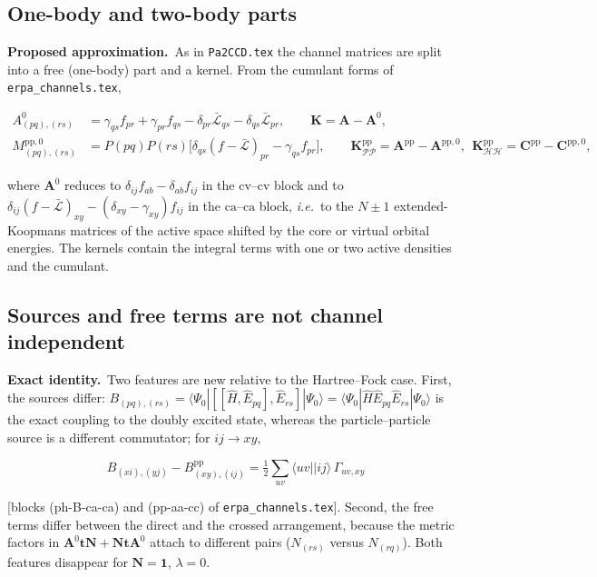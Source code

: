 \documentclass[aip,jcp,reprint,noshowkeys,superscriptaddress]{revtex4-1}
\newcommand{\ie}{\textit{i.e.}}
\newcommand{\bI}{\boldsymbol{1}}
\newcommand{\bA}{\boldsymbol{A}}
\newcommand{\bC}{\boldsymbol{C}}
\newcommand{\bN}{\boldsymbol{N}}
\newcommand{\pp}{\text{pp}}
\newcommand{\sLag}{\bar{\mathcal L}}
\newcommand{\scv}{\text{cv}}
\newcommand{\sca}{\text{ca}}
\newcommand{\Exact}{\textbf{Exact identity.}\ }
\newcommand{\Proposed}{\textbf{Proposed approximation.}\ }
\newcommand{\bt}{\boldsymbol{t}}
\newcommand{\bK}{\boldsymbol{K}}
\begin{document}
\subsection{One-body and two-body parts}

\Proposed As in \texttt{Pa2CCD.tex} the channel matrices are split into a
free (one-body) part and a kernel.  From the cumulant forms of
\texttt{erpa\_channels.tex},
\begin{widetext}
\begin{align}
  A^{0}_{(pq),(rs)}&=\gamma_{qs}f_{pr}+\gamma_{pr}f_{qs}-\delta_{pr}\sLag_{qs}-\delta_{qs}\sLag_{pr},
  \qquad \bK=\bA-\bA^{0},
  \label{eq:A0}\\
  M^{\pp,0}_{(pq),(rs)}&=P(pq)P(rs)\bigl[\delta_{qs}(f-\sLag)_{pr}-\gamma_{qs}f_{pr}\bigr],
  \qquad \bK^{\pp}_{\mathcal{PP}}=\bA^{\pp}-\bA^{\pp,0},\ \ \bK^{\pp}_{\mathcal{HH}}=\bC^{\pp}-\bC^{\pp,0},
  \label{eq:A0pp}
\end{align}
\end{widetext}
where $\bA^{0}$ reduces to $\delta_{ij}f_{ab}-\delta_{ab}f_{ij}$ in the
$\scv$--$\scv$ block and to $\delta_{ij}(f-\sLag)_{xy}-(\delta_{xy}-\gamma_{xy})f_{ij}$
in the $\sca$--$\sca$ block, \ie\ to the $N{\pm}1$ extended-Koopmans
matrices of the active space shifted by the core or virtual orbital
energies.  The kernels contain the integral terms with one or two active
densities and the cumulant.

\subsection{Sources and free terms are not channel independent}

\Exact Two features are new relative to the Hartree--Fock case.  First, the
sources differ: $B_{(pq),(rs)}=\langle\Psi_0|[[\hat H,\hat E_{pq}],\hat E_{rs}]|\Psi_0\rangle=\langle\Psi_0|\hat H\hat E_{pq}\hat E_{rs}|\Psi_0\rangle$
is the exact coupling to the doubly excited state, whereas the
particle--particle source is a different commutator; for $ij\to xy$,
\begin{widetext}
\begin{equation}
  B_{(xi),(yj)}-B^{\pp}_{(xy),(ij)}=\tfrac12\sum_{uv}\langle uv||ij\rangle\,\Gamma_{uv,xy}
  \label{eq:source-diff}
\end{equation}
\end{widetext}
[blocks (ph-B-ca-ca) and (pp-aa-cc) of \texttt{erpa\_channels.tex}].
Second, the free terms differ between the direct and the crossed arrangement,
because the metric factors in $\bA^0\bt\bN+\bN\bt\bA^0$ attach to different
pairs ($N_{(rs)}$ versus $N_{(rq)}$).  Both features disappear for
$\bN=\bI$, $\lambda=0$.
\end{document}
